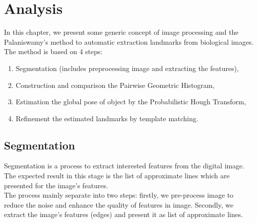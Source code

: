 \chapter{Analysis}
In this chapter, we present some generic concept of image processing and the Palaniswamy's method to automatic extraction landmarks from biological images. The method is based on 4 steps:
\begin{enumerate}
\item Segmentation (includes preprocessing image and extracting the features),
\item Construction and comparison the Pairwise Geometric Histogram,
\item Estimation the global pose of object by the Probabilistic Hough Transform,
\item Refinement the estimated landmarks by template matching.
\end{enumerate}
\section{Segmentation}
Segmentation is a process to extract interested features from the digital image. The expected result in this stage is the list of approximate lines which are presented for the image's features.\\
The process mainly separate into two steps: firstly, we pre-process image to reduce the noise and enhance the quality of features in image. Secondly, we extract the image's features (edges) and present it as list of approximate lines.
